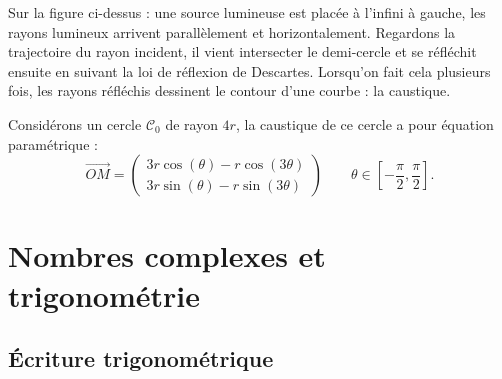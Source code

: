 \documentclass[11pt,class=report,crop=false]{standalone}
\begin{document}
\begin{exemple}
Sur la figure ci-dessus : une source lumineuse est placée à l'infini à gauche, les rayons lumineux arrivent parallèlement et horizontalement. Regardons la trajectoire du rayon incident, il vient intersecter le demi-cercle et se réfléchit ensuite en suivant la loi de réflexion de Descartes. Lorsqu'on fait cela plusieurs fois, les rayons réfléchis dessinent le contour d'une courbe : la caustique.


Considérons un cercle $\mathcal{C}_0$ de rayon $4r$, la caustique de ce cercle a pour équation paramétrique :
$$\vec{OM} = 
\begin{pmatrix}
	3r\cos(\theta) - r\cos\left(3\theta \right)  \\ 
	3r\sin(\theta) - r\sin\left(3\theta \right)
\end{pmatrix} \qquad \theta \in \left[-\frac\pi2, \frac\pi2\right].$$



\end{exemple}


\section{Nombres complexes et trigonométrie}


\subsection{Écriture trigonométrique}
\end{document}
